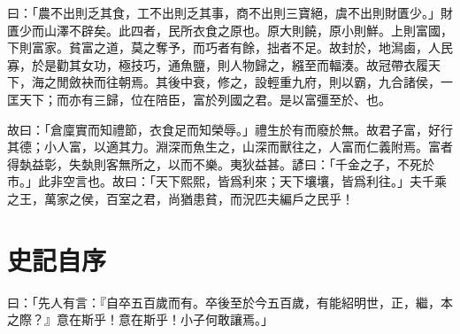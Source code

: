 曰：「農不出則乏其食，工不出則乏其事，商不出則三寶絕，虞不出則財匱少。」財匱少而山澤不辟矣。此四者，民所衣食之原也。原大則饒，原小則鮮。上則富國，下則富家。貧富之道，莫之奪予，而巧者有餘，拙者不足。故封於，地澙鹵，人民寡，於是勸其女功，極技巧，通魚鹽，則人物歸之，繦至而輻湊。故冠帶衣履天下，海之閒斂袂而往朝焉。其後中衰，修之，設輕重九府，則以霸，九合諸侯，一匡天下；而亦有三歸，位在陪臣，富於列國之君。是以富彊至於、也。

故曰：「倉廩實而知禮節，衣食足而知榮辱。」禮生於有而廢於無。故君子富，好行其德；小人富，以適其力。淵深而魚生之，山深而獸往之，人富而仁義附焉。富者得埶益彰，失埶則客無所之，以而不樂。夷狄益甚。諺曰：「千金之子，不死於市。」此非空言也。故曰：「天下熙熙，皆爲利來；天下壤壤，皆爲利往。」夫千乘之王，萬家之侯，百室之君，尚猶患貧，而況匹夫編戶之民乎！

\theendnotes

\section[太史公自序\quad{\small 史記}]{{\normalsize 史記}\quad {}自序}
曰：「先人有言：『自卒五百歲而有。卒後至於今五百歲，有能紹明世，正，繼，本之際？』意在斯乎！意在斯乎！小子何敢讓焉。」

